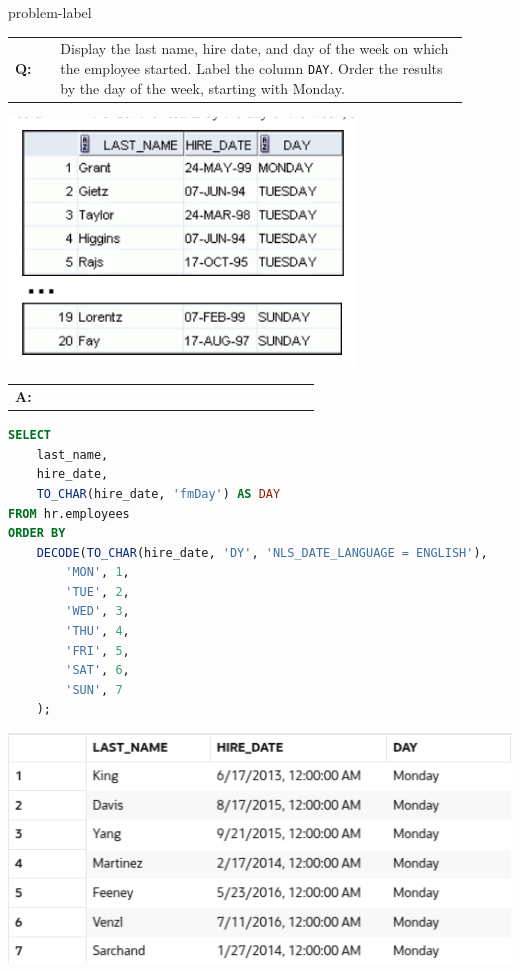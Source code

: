 \begin{problem}{}{problem-label}

\begin{tabular}{@{}l p{0.9\linewidth}@{}}
  \textbf{Q:} & Display the last name, hire date, and day of the week on which the employee started. Label the
column \texttt{DAY}. Order the results by the day of the week, starting with Monday.
\end{tabular}

\begin{center}
  \includegraphics[scale=0.8]{images/c4q3.png}
\end{center}

\begin{tabular}{@{}l p{0.9\linewidth}@{}}
  \textbf{A:} & 
\end{tabular}


\begin{lstlisting}[language=SQL]
SELECT 
    last_name, 
    hire_date, 
    TO_CHAR(hire_date, 'fmDay') AS DAY
FROM hr.employees
ORDER BY 
    DECODE(TO_CHAR(hire_date, 'DY', 'NLS_DATE_LANGUAGE = ENGLISH'),
        'MON', 1,
        'TUE', 2,
        'WED', 3,
        'THU', 4,
        'FRI', 5,
        'SAT', 6,
        'SUN', 7
    );
\end{lstlisting}

\vspace{1em}

\begin{center}
  \includegraphics[scale=0.8]{images/c4a3.png}
\end{center}

\end{problem}

